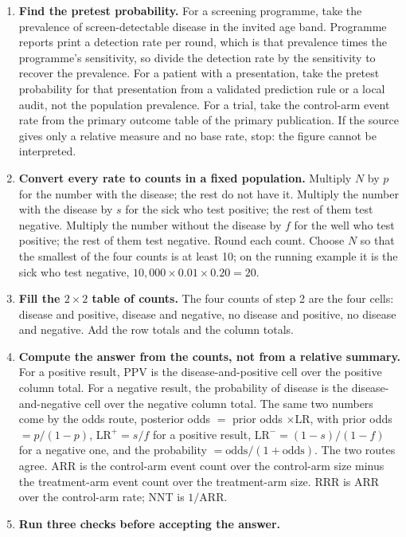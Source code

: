 \documentclass[11pt]{article}
\begin{document}
\begin{enumerate}[leftmargin=2em,itemsep=0.4em]
  \item \textbf{Find the pretest probability.} For a screening programme, take the prevalence of screen-detectable disease in the invited age band. Programme reports print a detection rate per round, which is that prevalence times the programme's sensitivity, so divide the detection rate by the sensitivity to recover the prevalence. For a patient with a presentation, take the pretest probability for that presentation from a validated prediction rule or a local audit, not the population prevalence. For a trial, take the control-arm event rate from the primary outcome table of the primary publication. If the source gives only a relative measure and no base rate, stop: the figure cannot be interpreted.
  \item \textbf{Convert every rate to counts in a fixed population.} Multiply $N$ by $p$ for the number with the disease; the rest do not have it. Multiply the number with the disease by $s$ for the sick who test positive; the rest of them test negative. Multiply the number without the disease by $f$ for the well who test positive; the rest of them test negative. Round each count. Choose $N$ so that the smallest of the four counts is at least 10; on the running example it is the sick who test negative, $10{,}000 \times 0.01 \times 0.20 = 20$.
  \item \textbf{Fill the $2\times 2$ table of counts.} The four counts of step 2 are the four cells: disease and positive, disease and negative, no disease and positive, no disease and negative. Add the row totals and the column totals.
  \item \textbf{Compute the answer from the counts, not from a relative summary.} For a positive result, PPV is the disease-and-positive cell over the positive column total. For a negative result, the probability of disease is the disease-and-negative cell over the negative column total. The same two numbers come by the odds route, posterior odds $=$ prior odds $\times \mathrm{LR}$, with prior odds $= p / (1 - p)$, $\mathrm{LR}^+ = s / f$ for a positive result, $\mathrm{LR}^- = (1 - s) / (1 - f)$ for a negative one, and the probability $= \text{odds} / (1 + \text{odds})$. The two routes agree. ARR is the control-arm event count over the control-arm size minus the treatment-arm event count over the treatment-arm size. RRR is ARR over the control-arm rate; NNT is $1/\mathrm{ARR}$.
  \item \textbf{Run three checks before accepting the answer.}

\end{enumerate}
\end{document}
